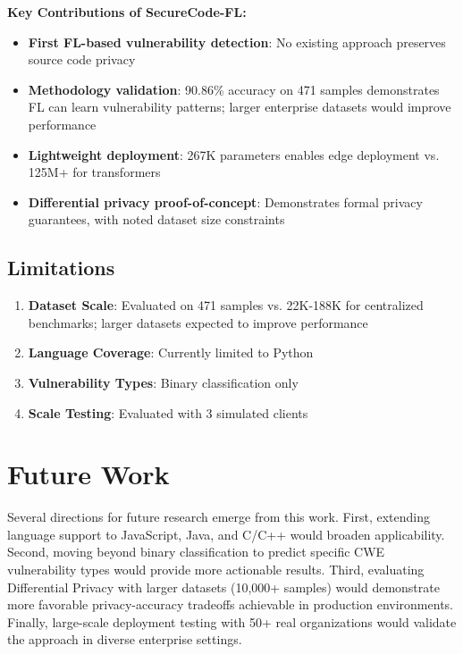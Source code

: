 \documentclass[conference]{IEEEtran}
\begin{document}
\textbf{Key Contributions of SecureCode-FL:}
\begin{itemize}
    \item \textbf{First FL-based vulnerability detection}: No existing approach preserves source code privacy
    \item \textbf{Methodology validation}: 90.86\% accuracy on 471 samples demonstrates FL can learn vulnerability patterns; larger enterprise datasets would improve performance
    \item \textbf{Lightweight deployment}: 267K parameters enables edge deployment vs. 125M+ for transformers
    \item \textbf{Differential privacy proof-of-concept}: Demonstrates formal privacy guarantees, with noted dataset size constraints
\end{itemize}

\subsection{Limitations}

\begin{enumerate}
    \item \textbf{Dataset Scale}: Evaluated on 471 samples vs. 22K-188K for centralized benchmarks; larger datasets expected to improve performance
    \item \textbf{Language Coverage}: Currently limited to Python
    \item \textbf{Vulnerability Types}: Binary classification only
    \item \textbf{Scale Testing}: Evaluated with 3 simulated clients
\end{enumerate}

\section{Future Work}

Several directions for future research emerge from this work. First, extending language support to JavaScript, Java, and C/C++ would broaden applicability. Second, moving beyond binary classification to predict specific CWE vulnerability types would provide more actionable results. Third, evaluating Differential Privacy with larger datasets (10,000+ samples) would demonstrate more favorable privacy-accuracy tradeoffs achievable in production environments. Finally, large-scale deployment testing with 50+ real organizations would validate the approach in diverse enterprise settings.
\end{document}
